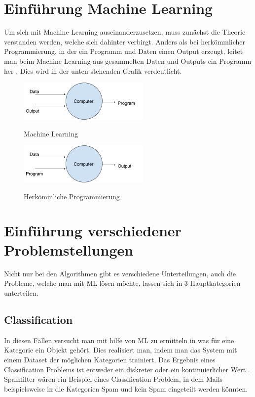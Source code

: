 \chapter{Einführung Machine Learning}
\label{chap:einführungMachineLearning}
Um sich mit Machine Learning auseinanderzusetzen, muss zunächst die Theorie verstanden werden, welche sich dahinter verbirgt. Anders als bei herkömmlicher Programmierung, in der ein Programm und Daten einen Output erzeugt, leitet man beim Machine Learning aus gesammelten Daten und Outputs ein Programm her \cite[S.~3]{WML}.  Dies wird in der unten stehenden Grafik verdeutlicht.
\newline

\begin{figure}
	\includegraphics[]{../Bilder/sBdyby6FyPckxbimKufRD4Q.png}
	\caption{Machine Learning}\cite[S.~3]{WML}
\end{figure}
\begin{figure}
	\includegraphics[]{../Bilder/sZFI1L7gymY3C_ipjtqSvrg.png}
	\caption{Herkömmliche Programmierung}\cite[S.~3]{WML}
\end{figure}


\chapter{Einführung verschiedener Problemstellungen}
\label{chap:einführungProblemstellungen}
Nicht nur bei den Algorithmen gibt es verschiedene Unterteilungen, auch die Probleme, welche man mit \ac{ML} lösen möchte, lassen sich in 3 Hauptkategorien unterteilen.

\section{Classification}
\label{sec:classification}
In diesen Fällen versucht man mit hilfe von \ac{ML} zu ermitteln in was für eine Kategorie ein Objekt gehört\cite{SKL}. Dies realisiert man, indem man das System mit einem Dataset der möglichen Kategorien trainiert. Das Ergebnis eines Classification Problems ist entweder ein diskreter oder ein kontinuierlicher Wert \cite[S.~4]{WML}. Spamfilter wären ein Beispiel eines Classification Problem, in dem Mails beispielsweise in die Kategorien Spam und kein Spam eingeteilt werden könnten. 

